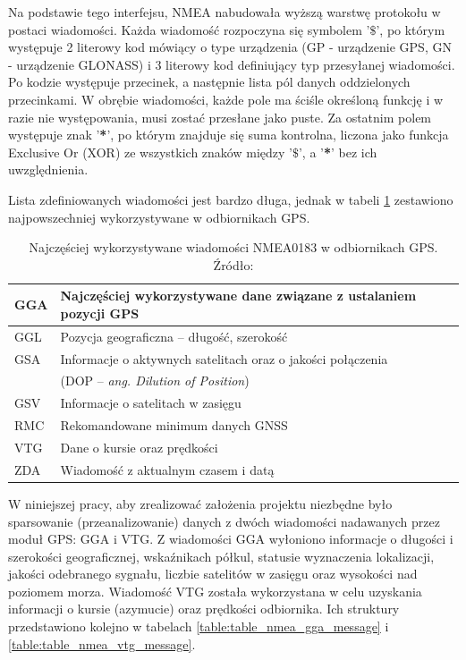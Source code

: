Na podstawie tego interfejsu, NMEA nabudowała wyższą warstwę protokołu w postaci wiadomości. Każda wiadomość rozpoczyna się symbolem '\textbf{$\$$}', po którym występuje 2 literowy kod mówiący o type urządzenia (GP - urządzenie GPS, GN - urządzenie GLONASS) i 3 literowy kod definiujący typ przesyłanej wiadomości. Po kodzie występuje przecinek, a następnie lista pól danych oddzielonych przecinkami. W obrębie wiadomości, każde pole ma ściśle określoną funkcję i w razie nie występowania, musi zostać przesłane jako puste. Za ostatnim polem występuje znak '\textbf{*}', po którym znajduje się suma kontrolna, liczona jako funkcja Exclusive Or (XOR) ze wszystkich znaków między '\textbf{$\$$}', a '\textbf{*}' bez ich uwzględnienia. 

Lista zdefiniowanych wiadomości jest bardzo długa, jednak w tabeli \ref{table:table_nmea_messages} zestawiono najpowszechniej wykorzystywane w odbiornikach GPS.

\begin{table}[H]
\centering
\caption{Najczęściej wykorzystywane wiadomości NMEA0183 w odbiornikach GPS.\\ Źródło: \cite{inzynierka}}
\label{table:table_nmea_messages}
\begin{tabular}{| l | l |}
\hline
GGA & Najczęściej wykorzystywane dane związane z ustalaniem pozycji GPS \\  \hline
GGL & Pozycja geograficzna – długość, szerokość \\  \hline
GSA & Informacje o aktywnych satelitach oraz o jakości połączenia \\ 
    & (DOP – \textit{ang.    Dilution of Position}) \\ \hline
GSV & Informacje o satelitach w zasięgu \\ \hline
RMC & Rekomandowane minimum danych GNSS \\ \hline
VTG & Dane o kursie oraz prędkości \\ \hline
ZDA & Wiadomość z aktualnym czasem i datą \\ \hline
\end{tabular}
\end{table}

W niniejszej pracy, aby zrealizować założenia projektu niezbędne było sparsowanie (przeanalizowanie) danych z dwóch wiadomości nadawanych przez moduł GPS: GGA i VTG.
Z wiadomości GGA  wyłoniono informacje o długości i szerokości geograficznej, wskaźnikach półkul, statusie wyznaczenia lokalizacji, jakości odebranego sygnału, liczbie satelitów w zasięgu oraz wysokości nad poziomem morza. Wiadomość VTG została wykorzystana w celu uzyskania informacji o kursie (azymucie) oraz prędkości odbiornika. Ich struktury przedstawiono kolejno w tabelach \ref{table:table_nmea_gga_message} i \ref{table:table_nmea_vtg_message}.

